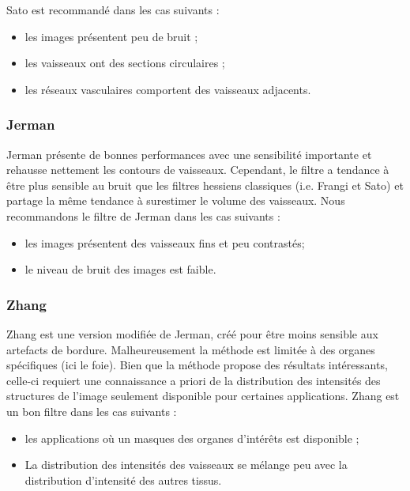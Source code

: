 Sato est recommandé dans les cas suivants :

\begin{itemize}
  \item les images présentent peu de bruit ;
  \item les vaisseaux ont des sections circulaires ;
  \item les réseaux vasculaires comportent des vaisseaux adjacents.
\end{itemize}

\subsubsection*{Jerman}

Jerman présente de bonnes performances avec une sensibilité importante et rehausse nettement les contours de vaisseaux. Cependant, le filtre a tendance à être plus sensible au bruit que les filtres hessiens classiques (i.e. Frangi et Sato) et partage la même tendance à surestimer le volume des vaisseaux. Nous recommandons le filtre de Jerman dans les cas suivants : 

\begin{itemize}
\item les images présentent des vaisseaux fins et peu contrastés;
\item le niveau de bruit des images est faible.
\end{itemize}

\subsubsection*{Zhang}

Zhang est une version modifiée de Jerman, créé pour être moins sensible aux artefacts de bordure. Malheureusement la méthode est limitée à des organes spécifiques (ici le  foie). Bien que la méthode propose des résultats intéressants, celle-ci requiert une connaissance a priori de la distribution des intensités des structures de l'image seulement disponible pour certaines applications. Zhang est un bon filtre dans les cas suivants :

\begin{itemize}
\item les applications où un masques des organes d'intérêts est disponible ;
\item La distribution des intensités des vaisseaux se mélange peu avec la distribution d'intensité des autres tissus.
\end{itemize}

